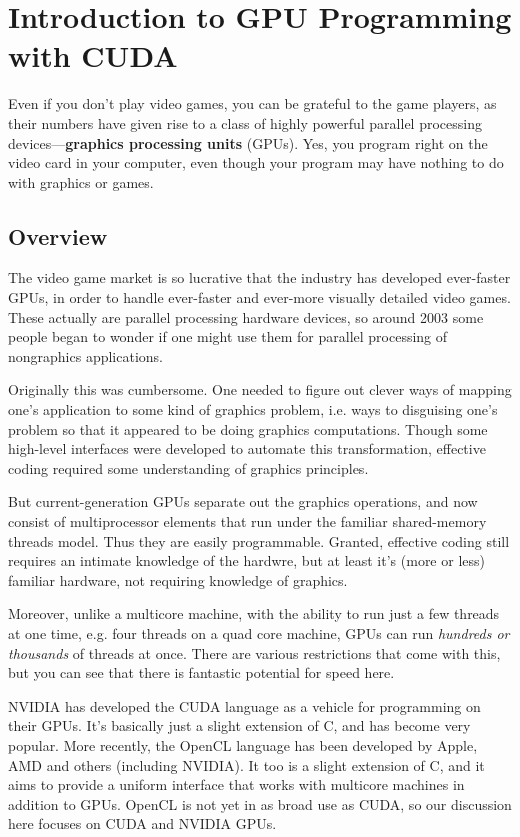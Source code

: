 \chapter{Introduction to GPU Programming with CUDA}
\label{chap:cuda} 

Even if you don't play video games, you can be grateful to the game
players, as their numbers have given rise to a class of highly powerful
parallel processing devices---{\bf graphics processing units} (GPUs).
Yes, you program right on the video card in your computer, even though
your program may have nothing to do with graphics or games.

\section{Overview}

The video game market is so lucrative that the industry has developed
ever-faster GPUs, in order to handle ever-faster and ever-more visually
detailed video games.  These actually are parallel processing hardware
devices, so around 2003 some people began to wonder if one might use
them for parallel processing of nongraphics applications.

Originally this was cumbersome.  One needed to figure out clever ways of
mapping one's application to some kind of graphics problem, i.e. ways
to disguising one's problem so that it appeared to be doing graphics
computations.  Though some high-level interfaces were developed to
automate this transformation, effective coding required some
understanding of graphics principles.

But current-generation GPUs separate out the graphics operations, and
now consist of multiprocessor elements that run under the familiar
shared-memory threads model.  Thus they are easily programmable.
Granted, effective coding still requires an intimate knowledge of the
hardwre, but at least it's (more or less) familiar hardware, not
requiring knowledge of graphics.

Moreover, unlike a multicore machine, with the ability to run just a few
threads at one time, e.g. four threads on a quad core machine, GPUs can
run {\it  hundreds or thousands} of threads at once.  There are various
restrictions that come with this, but you can see that there is
fantastic potential for speed here.

NVIDIA has developed the CUDA language as a vehicle for programming on
their GPUs.  It's basically just a slight extension of C, and has become
very popular.  More recently, the OpenCL language has been developed by
Apple, AMD and others (including NVIDIA).  It too is a slight extension
of C, and it aims to provide a uniform interface that works with
multicore machines in addition to GPUs.  OpenCL is not yet in as broad
use as CUDA, so our discussion here focuses on CUDA and NVIDIA GPUs.


